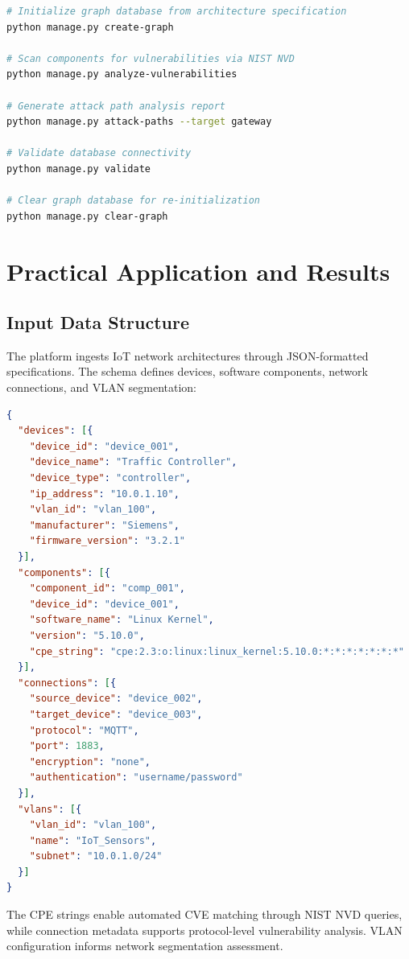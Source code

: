\documentclass[11pt,a4paper]{article}
\begin{document}
\begin{lstlisting}[language=bash, caption=Core CLI Commands]
# Initialize graph database from architecture specification
python manage.py create-graph

# Scan components for vulnerabilities via NIST NVD
python manage.py analyze-vulnerabilities

# Generate attack path analysis report
python manage.py attack-paths --target gateway

# Validate database connectivity
python manage.py validate

# Clear graph database for re-initialization
python manage.py clear-graph
\end{lstlisting}

\newpage
\section{Practical Application and Results}

\subsection{Input Data Structure}

The platform ingests IoT network architectures through JSON-formatted specifications. The schema defines devices, software components, network connections, and VLAN segmentation:

\begin{lstlisting}[language=json, caption=IoT Architecture JSON Structure]
{
  "devices": [{
    "device_id": "device_001",
    "device_name": "Traffic Controller",
    "device_type": "controller",
    "ip_address": "10.0.1.10",
    "vlan_id": "vlan_100",
    "manufacturer": "Siemens",
    "firmware_version": "3.2.1"
  }],
  "components": [{
    "component_id": "comp_001",
    "device_id": "device_001",
    "software_name": "Linux Kernel",
    "version": "5.10.0",
    "cpe_string": "cpe:2.3:o:linux:linux_kernel:5.10.0:*:*:*:*:*:*:*"
  }],
  "connections": [{
    "source_device": "device_002",
    "target_device": "device_003",
    "protocol": "MQTT",
    "port": 1883,
    "encryption": "none",
    "authentication": "username/password"
  }],
  "vlans": [{
    "vlan_id": "vlan_100",
    "name": "IoT_Sensors",
    "subnet": "10.0.1.0/24"
  }]
}
\end{lstlisting}

The CPE strings enable automated CVE matching through NIST NVD queries, while connection metadata supports protocol-level vulnerability analysis. VLAN configuration informs network segmentation assessment.
\end{document}
